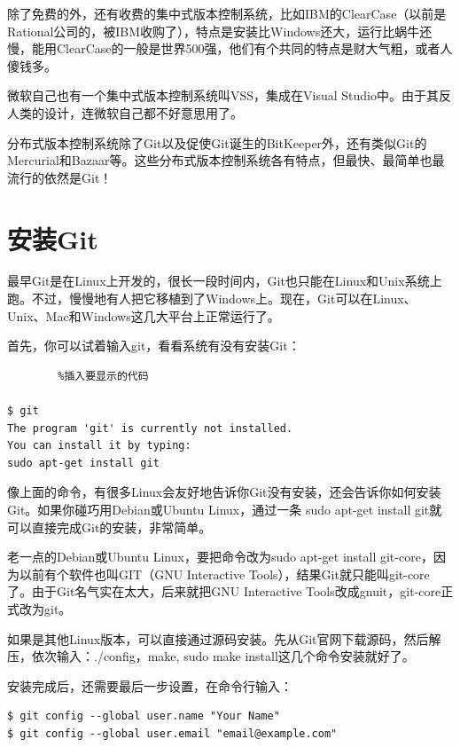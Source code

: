 \documentclass[•]{article}
\begin{document}
\begin{CJK}{UTF8}{gbsn}
\qquad 除了免费的外，还有收费的集中式版本控制系统，比如IBM的ClearCase（以前是Rational公司的，被IBM收购了），特点是安装比Windows还大，运行比蜗牛还慢，能用ClearCase的一般是世界500强，他们有个共同的特点是财大气粗，或者人傻钱多。

\qquad 微软自己也有一个集中式版本控制系统叫VSS，集成在Visual Studio中。由于其反人类的设计，连微软自己都不好意思用了。

\qquad 分布式版本控制系统除了Git以及促使Git诞生的BitKeeper外，还有类似Git的Mercurial和Bazaar等。这些分布式版本控制系统各有特点，但最快、最简单也最流行的依然是Git！
\section{安装Git}

\begin{sloppypar}  
\qquad 最早Git是在Linux上开发的，很长一段时间内，Git也只能在Linux和Unix系统上跑。不过，慢慢地有人把它移植到了Windows上。现在，Git可以在Linux、Unix、Mac和Windows这几大平台上正常运行了。
\end{sloppypar}

\qquad 首先，你可以试着输入git，看看系统有没有安装Git：

\lstset{language=C}
\begin{lstlisting}        %插入要显示的代码

$ git
The program 'git' is currently not installed. 
You can install it by typing:
sudo apt-get install git
\end{lstlisting}

\qquad 像上面的命令，有很多Linux会友好地告诉你Git没有安装，还会告诉你如何安装Git。如果你碰巧用Debian或Ubuntu Linux，通过一条{\color{red} sudo apt-get install git}就可以直接完成Git的安装，非常简单。

\qquad 老一点的Debian或Ubuntu Linux，要把命令改为{\color{red}sudo apt-get install git-core}，因为以前有个软件也叫GIT（GNU Interactive Tools），结果Git就只能叫{\color{red}git-core}了。由于Git名气实在太大，后来就把GNU Interactive Tools改成{\color{red}gnuit，}{\color{red}git-core}正式改为{\color{red}git}。

\qquad 如果是其他Linux版本，可以直接通过源码安装。先从Git官网下载源码，然后解压，依次输入：{\color{red}./config}，{\color{red}make}, {\color{red}sudo make install}这几个命令安装就好了。

安装完成后，还需要最后一步设置，在命令行输入：

\lstset{language=C}
\begin{lstlisting} 
$ git config --global user.name "Your Name"
$ git config --global user.email "email@example.com"
\end{lstlisting}


\end{CJK}
\end{document}
